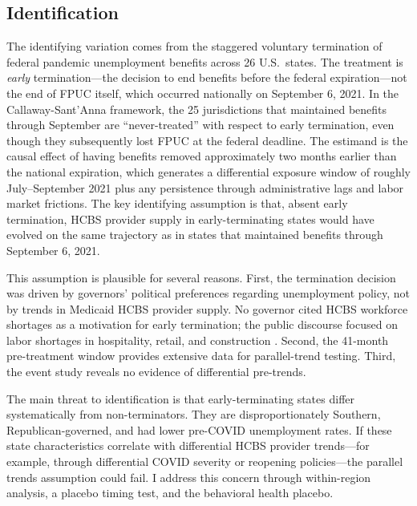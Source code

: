 \documentclass[12pt]{article}
\begin{document}
\subsection{Identification}

The identifying variation comes from the staggered voluntary termination of federal pandemic unemployment benefits across 26 U.S.\ states. The treatment is \textit{early} termination---the decision to end benefits before the federal expiration---not the end of FPUC itself, which occurred nationally on September 6, 2021. In the Callaway-Sant'Anna framework, the 25 jurisdictions that maintained benefits through September are ``never-treated'' with respect to early termination, even though they subsequently lost FPUC at the federal deadline. The estimand is the causal effect of having benefits removed approximately two months earlier than the national expiration, which generates a differential exposure window of roughly July--September 2021 plus any persistence through administrative lags and labor market frictions. The key identifying assumption is that, absent early termination, HCBS provider supply in early-terminating states would have evolved on the same trajectory as in states that maintained benefits through September 6, 2021.

This assumption is plausible for several reasons. First, the termination decision was driven by governors' political preferences regarding unemployment policy, not by trends in Medicaid HCBS provider supply. No governor cited HCBS workforce shortages as a motivation for early termination; the public discourse focused on labor shortages in hospitality, retail, and construction \citep{holzer2021}. Second, the 41-month pre-treatment window provides extensive data for parallel-trend testing. Third, the event study reveals no evidence of differential pre-trends.

The main threat to identification is that early-terminating states differ systematically from non-terminators. They are disproportionately Southern, Republican-governed, and had lower pre-COVID unemployment rates. If these state characteristics correlate with differential HCBS provider trends---for example, through differential COVID severity or reopening policies---the parallel trends assumption could fail. I address this concern through within-region analysis, a placebo timing test, and the behavioral health placebo.
\end{document}

